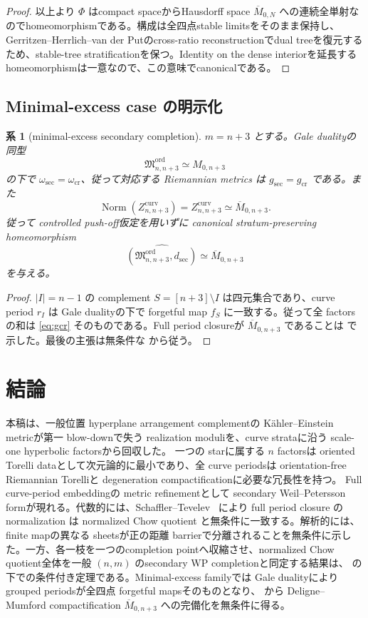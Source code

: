 \documentclass[11pt,a4paper]{ltjsarticle}
\newcommand{\Norm}{\operatorname{Norm}}
\newcommand{\ov}{\overline}
\newcommand{\Mord}{\mathfrak M^{\mathrm{ord}}}
\theoremstyle{plain}
\newtheorem{corollary}[corollary]{系}
\theoremstyle{definition}
\theoremstyle{remark}
\begin{document}
\begin{proof}
以上より $\Phi$ はcompact spaceからHausdorff space $\ov M_{0,N}$ への連続全単射なのでhomeomorphismである。構成は全四点stable limitsをそのまま保持し、Gerritzen--Herrlich--van der Putのcross-ratio reconstructionでdual treeを復元するため、stable-tree stratificationを保つ。Identity on the dense interiorを延長するhomeomorphismは一意なので、この意味でcanonicalである。
\end{proof}

\subsection{Minimal-excess case の明示化}
\begin{corollary}[minimal-excess secondary completion]
\label{cor:minimal-completion}
$m=n+3$ とする。Gale dualityの同型
\[
 \Mord_{n,n+3}\simeq M_{0,n+3}
\]
の下で $\omega_{\mathrm{sec}}=\omega_{\mathrm{cr}}$、従って対応する Riemannian metrics は $g_{\mathrm{sec}}=g_{\mathrm{cr}}$ である。また
\[
 \Norm(Z_{n,n+3}^{\mathrm{curv}})
 =Z_{n,n+3}^{\mathrm{curv}}
 \simeq\ov M_{0,n+3}.
\]
従って controlled push-off仮定を用いずに canonical stratum-preserving homeomorphism
\[
 \widehat{(\Mord_{n,n+3},d_{\mathrm{sec}})}
 \simeq\ov M_{0,n+3}
\]
を与える。
\end{corollary}

\begin{proof}
$|I|=n-1$ の complement $S=[n+3]\setminus I$ は四元集合であり、curve period $r_I$ は Gale dualityの下で forgetful map $f_S$ に一致する。従って全 factorsの和は \eqref{eq:gcr} そのものである。Full period closureが $\ov M_{0,n+3}$ であることは  で示した。最後の主張は無条件な  から従う。
\end{proof}

\section{結論}
本稿は、一般位置 hyperplane arrangement complementの K\"ahler--Einstein metricが第一 blow-downで失う realization moduliを、curve strataに沿う scale-one hyperbolic factorsから回収した。
一つの starに属する $n$ factorsは oriented Torelli dataとして次元論的に最小であり、全 curve periodsは orientation-free Riemannian Torelliと degeneration compactificationに必要な冗長性を持つ。
Full curve-period embeddingの metric refinementとして secondary Weil--Petersson formが現れる。代数的には、Schaffler--Tevelev~\cite[Corollary~3.5]{ST} により full period closure の normalization は normalized Chow quotient と無条件に一致する。解析的には、finite mapの異なる sheetsが正の距離 barrierで分離されることを無条件に示した。一方、各一枝を一つのcompletion pointへ収縮させ、normalized Chow quotient全体を一般 $(n,m)$ のsecondary WP completionと同定する結果は、 の下での条件付き定理である。Minimal-excess familyでは Gale dualityにより grouped periodsが全四点 forgetful mapsそのものとなり、 から Deligne--Mumford compactification $\ov M_{0,n+3}$ への完備化を無条件に得る。
\end{document}
